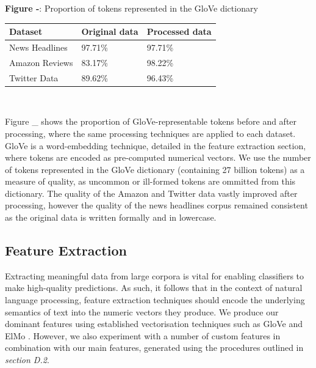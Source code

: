 \documentclass[12pt,a4paper]{article}
\begin{document}
\begin{center}
	\textbf{Figure -}:  Proportion of tokens represented in the GloVe dictionary\\
	\vspace{4pt}
	\begin{tabular}{p{3cm}||p{3cm}p{3cm}}
		\hline
		\textbf{Dataset} & \textbf{Original data} & \textbf{Processed data}\\
		\hline
		News Headlines & \hspace{20pt}97.71\% & \hspace{20pt}97.71\%\\
		\hline
		Amazon Reviews & \hspace{20pt}83.17\% & \hspace{20pt}98.22\%\\
		\hline
		Twitter Data & \hspace{20pt}89.62\% & \hspace{20pt}96.43\%\\
		\hline
	\end{tabular}\\
\end{center}

\noindent Figure \_ shows the proportion of GloVe-representable tokens before and after processing, where the same processing techniques are applied to each dataset. GloVe is a word-embedding technique, detailed in the feature extraction section, where tokens are encoded as pre-computed numerical vectors. We use the number of tokens represented in the GloVe dictionary (containing 27 billion tokens) as a measure of quality, as uncommon or ill-formed tokens are ommitted from this dictionary. The quality of the Amazon and Twitter data vastly improved after processing, however the quality of the news headlines corpus remained consistent as the original data is written formally and in lowercase.



\subsection{Feature Extraction}
\vspace{-4.2pt}
\noindent Extracting meaningful data from large corpora is vital for enabling classifiers to make high-quality predictions. As such, it follows that in the context of natural language processing, feature extraction techniques should encode the underlying semantics of text into the numeric vectors they produce. We produce our dominant features using established vectorisation techniques such as GloVe \cite{pennington2014glove} and ElMo \cite{peters2018deep}. However, we also experiment with a number of custom features in combination with our main features, generated using the procedures outlined in \textit{section D.2}. \vspace{-4.2pt}
\end{document}
